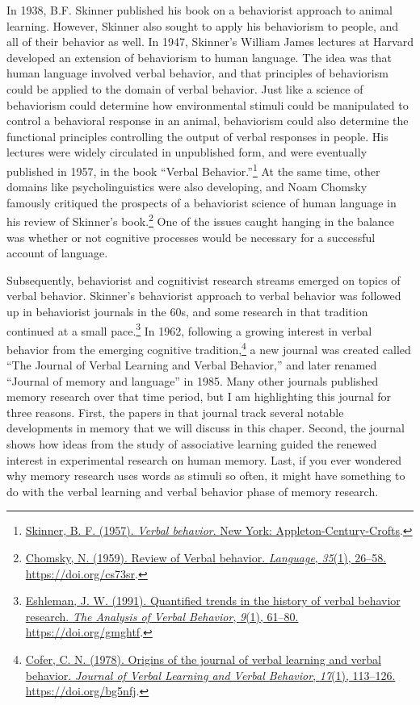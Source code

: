 \documentclass[
  oneside,
  12pt]{crumpbook}
\begin{document}
In 1938, B.F. Skinner published his book on a behaviorist approach to animal learning. However, Skinner also sought to apply his behaviorism to people, and all of their behavior as well. In 1947, Skinner's William James lectures at Harvard developed an extension of behaviorism to human language. The idea was that human language involved verbal behavior, and that principles of behaviorism could be applied to the domain of verbal behavior. Just like a science of behaviorism could determine how environmental stimuli could be manipulated to control a behavioral response in an animal, behaviorism could also determine the functional principles controlling the output of verbal responses in people. His lectures were widely circulated in unpublished form, and were eventually published in 1957, in the book ``Verbal Behavior.''\footnote{\protect\hyperlink{ref-skinnerVerbalBehavior1957}{Skinner, B. F. (1957). \emph{Verbal behavior}. {New York: Appleton-Century-Crofts}}.} At the same time, other domains like psycholinguistics were also developing, and Noam Chomsky famously critiqued the prospects of a behaviorist science of human language in his review of Skinner's book.\footnote{\protect\hyperlink{ref-chomskyReviewVerbalBehavior1959}{Chomsky, N. (1959). Review of {Verbal} behavior. \emph{Language}, \emph{35}(1), 26--58. \url{https://doi.org/cs73sr}}.} One of the issues caught hanging in the balance was whether or not cognitive processes would be necessary for a successful account of language.

Subsequently, behaviorist and cognitivist research streams emerged on topics of verbal behavior. Skinner's behaviorist approach to verbal behavior was followed up in behaviorist journals in the 60s, and some research in that tradition continued at a small pace.\footnote{\protect\hyperlink{ref-eshlemanQuantifiedTrendsHistory1991}{Eshleman, J. W. (1991). Quantified trends in the history of verbal behavior research. \emph{The Analysis of Verbal Behavior}, \emph{9}(1), 61--80. \url{https://doi.org/gmghtf}}.} In 1962, following a growing interest in verbal behavior from the emerging cognitive tradition,\footnote{\protect\hyperlink{ref-coferOriginsJournalVerbal1978}{Cofer, C. N. (1978). Origins of the journal of verbal learning and verbal behavior. \emph{Journal of Verbal Learning and Verbal Behavior}, \emph{17}(1), 113--126. \url{https://doi.org/bg5nfj}}.} a new journal was created called ``The Journal of Verbal Learning and Verbal Behavior,'' and later renamed ``Journal of memory and language'' in 1985. Many other journals published memory research over that time period, but I am highlighting this journal for three reasons. First, the papers in that journal track several notable developments in memory that we will discuss in this chaper. Second, the journal shows how ideas from the study of associative learning guided the renewed interest in experimental research on human memory. Last, if you ever wondered why memory research uses words as stimuli so often, it might have something to do with the verbal learning and verbal behavior phase of memory research.
\end{document}
